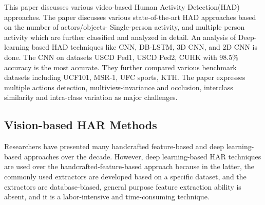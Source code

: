 \documentclass[twocolumn]{article}
\begin{document}
\cite{b4} This paper discusses various video-based Human Activity Detection(HAD) approaches. The paper discusses various state-of-the-art HAD approaches based on the number of actors/objects- Single-person activity, and multiple person activity which are further classified and analyzed in detail. An analysis of Deep-learning based HAD techniques like CNN, DB-LSTM, 3D CNN, and 2D CNN is done. The CNN on datasets USCD Ped1, USCD Ped2, CUHK with 98.5\% accuracy is the most accurate. They further compared various benchmark datasets including UCF101, MSR-1, UFC sports, KTH. The paper expresses multiple actions detection, multiview-invariance and occlusion,
interclass similarity and intra-class variation as major challenges.\\


\subsection{Vision-based HAR Methods}
Researchers have presented many handcrafted feature-based and deep learning-based approaches over the decade. However, deep learning-based HAR techniques are used over
the handcrafted-feature-based approach because in the latter, the commonly used extractors are developed based on a specific dataset, and the extractors are database-biased, general
purpose feature extraction ability is absent, and it is a labor-intensive and time-consuming technique.
\end{document}
